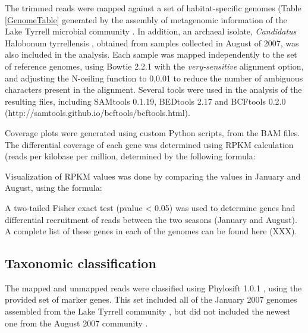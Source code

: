 The trimmed reads were mapped against a set of habitat-specific genomes (Table \ref{GenomeTable} generated by the assembly of metagenomic information of the Lake Tyrrell microbial community \cite{Narasingarao:2012kp,Podell:2013kx,Podell:2013fp}. In addition, an archaeal isolate, \textit{Candidatus} Halobonum tyrrellensis \cite{Ugalde:2013hb}, obtained from samples collected in August of 2007, was also included in the analysis. Each sample was mapped independently to the set of reference genomes, using Bowtie 2.2.1 \cite{Langmead:2012jh} with the \textit{very-sensitive} alignment option, and adjusting the N-ceiling function to 0,0.01 to reduce the number of ambiguous characters present in the alignment. Several tools were used in the analysis of the resulting files, including SAMtools 0.1.19\cite{Li:2009ka}, BEDtools 2.17 \cite{Quinlan:2010km} and BCFtools 0.2.0 (http://samtools.github.io/bcftools/bcftools.html).

Coverage plots were generated using custom Python scripts, from the BAM files. The differential coverage of each gene was determined using RPKM calculation (reads per kilobase per million, determined by the following formula:

\begin{center}
\end{center}

Visualization of RPKM values was done by comparing the values in January and August, using the formula:

\begin{center}
\end{center}

A two-tailed Fisher exact test (pvalue < 0.05) was used to determine genes had differential recruitment of reads between the two seasons (January and August). A complete list of these genes in each of the genomes can be found here (XXX).

\subsection{Taxonomic classification}

The mapped and unmapped reads were classified using Phylosift 1.0.1 \cite{Darling:2014ej}, using the provided set of marker genes. This set included all of the January 2007 genomes assembled from the Lake Tyrrell community \cite{Narasingarao:2012kp,Podell:2013kx}, but did not included the newest one from the August 2007 community \cite{Podell:2013fp}.

